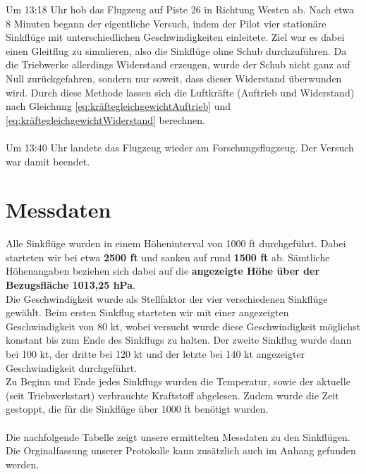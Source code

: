 \vspace{-0.3cm}
\begin{center}
\end{center}
\vspace{0.8cm}

\noindent Um 13:18 Uhr hob das Flugzeug auf Piste 26 in Richtung Westen ab. Nach etwa 8 Minuten begann der eigentliche Versuch, indem der Pilot vier stationäre Sinkflüge mit unterschiedlichen Geschwindigkeiten einleitete. Ziel war es dabei einen Gleitflug zu simulieren, also die Sinkflüge ohne Schub durchzuführen. Da die Triebwerke allerdings Widerstand erzeugen, wurde der Schub nicht ganz auf Null zurückgefahren, sondern nur soweit, dass dieser Widerstand überwunden wird. Durch diese Methode lassen sich die Luftkräfte (Auftrieb und Widerstand) nach Gleichung \ref{eq:kräftegleichgewichtAuftrieb} und \ref{eq:kräftegleichgewichtWiderstand} berechnen.\\\\  
Um 13:40 Uhr landete das Flugzeug wieder am Forschungsflugzeug. Der Versuch war damit beendet.

\section{Messdaten}
Alle Sinkflüge wurden in einem Höheninterval von 1000 ft durchgeführt. Dabei starteten wir bei etwa \textbf{2500 ft} und sanken auf rund \textbf{1500 ft} ab. Sämtliche Höhenangaben beziehen sich dabei auf die \textbf{angezeigte Höhe über der Bezugsfläche 1013,25 hPa}.\\
Die Geschwindigkeit wurde als Stellfaktor der vier verschiedenen Sinkflüge gewählt. Beim ersten Sinkflug starteten wir mit einer angezeigten Geschwindigkeit von 80 kt, wobei versucht wurde diese Geschwindigkeit möglichst konstant bis zum Ende des Sinkflugs zu halten. Der zweite Sinkflug wurde dann bei 100 kt, der dritte bei 120 kt und der letzte bei 140 kt angezeigter Geschwindigkeit durchgeführt.\\
Zu Beginn und Ende jedes Sinkflugs wurden die Temperatur, sowie der aktuelle (seit Triebwerkstart) verbrauchte Kraftstoff abgelesen. Zudem wurde die Zeit gestoppt, die für die Sinkflüge über 1000 ft benötigt wurden.\\\\
Die nachfolgende Tabelle zeigt unsere ermittelten Messdaten zu den Sinkflügen. Die Orginalfassung unserer Protokolle kann zusätzlich auch im Anhang gefunden werden.\\

